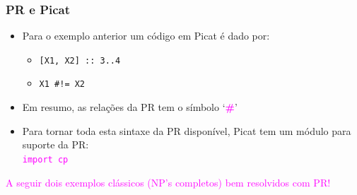 \begin{frame}[fragile]
\frametitle{PR e Picat}

\begin{block}{}

\begin{itemize}
    \item Para o exemplo anterior um  código em Picat é dado por:
      \pause
    \begin{itemize}
        \item \texttt{[X1, X2] :: 3..4}
        \item \texttt{X1 \#!= X2} 
     \end{itemize}  
      
      \pause
     \item Em resumo, as relações da PR tem o símbolo `\textbf{\textcolor{magenta}{{\#}}}' 

  \pause
  \item Para tornar toda esta sintaxe da PR disponível, Picat 
        tem um módulo para suporte da PR:\\
         \textcolor{magenta}{\texttt{import cp}}
    
\end{itemize}

\end{block}
    
\begin{center}
      \textcolor{magenta}{A seguir dois exemplos clássicos (NP's completos) bem resolvidos com PR!} 
   \end{center}
   
\end{frame}


